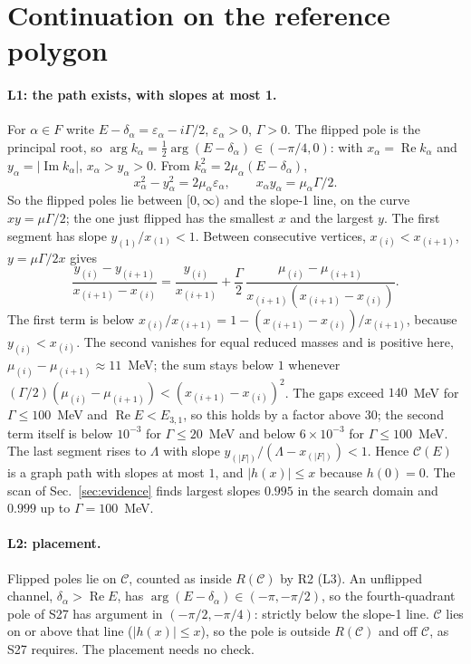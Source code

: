 \documentclass[11pt]{article}
\begin{document}
\section{Continuation on the reference polygon}

\paragraph{L1: the path exists, with slopes at most 1.} For $\alpha\in F$ write $E-\delta_\alpha=\varepsilon_\alpha-i\Gamma/2$, $\varepsilon_\alpha>0$, $\Gamma>0$. The flipped pole is the principal root, so $\arg k_\alpha=\tfrac12\arg(E-\delta_\alpha)\in(-\pi/4,0)$: with $x_\alpha=\operatorname{Re}k_\alpha$ and $y_\alpha=|\operatorname{Im}k_\alpha|$, $x_\alpha>y_\alpha>0$. From $k_\alpha^2=2\mu_\alpha(E-\delta_\alpha)$,
\[
x_\alpha^2-y_\alpha^2=2\mu_\alpha\varepsilon_\alpha,\qquad x_\alpha y_\alpha=\mu_\alpha\Gamma/2 .
\]
So the flipped poles lie between $[0,\infty)$ and the slope-1 line, on the curve $xy=\mu\Gamma/2$; the one just flipped has the smallest $x$ and the largest $y$. The first segment has slope $y_{(1)}/x_{(1)}<1$. Between consecutive vertices, $x_{(i)}<x_{(i+1)}$, $y=\mu\Gamma/2x$ gives
\[
\frac{y_{(i)}-y_{(i+1)}}{x_{(i+1)}-x_{(i)}}=\frac{y_{(i)}}{x_{(i+1)}}+\frac{\Gamma}{2}\,\frac{\mu_{(i)}-\mu_{(i+1)}}{x_{(i+1)}(x_{(i+1)}-x_{(i)})} .
\]
The first term is below $x_{(i)}/x_{(i+1)}=1-(x_{(i+1)}-x_{(i)})/x_{(i+1)}$, because $y_{(i)}<x_{(i)}$. The second vanishes for equal reduced masses and is positive here, $\mu_{(i)}-\mu_{(i+1)}\approx11$~MeV; the sum stays below $1$ whenever $(\Gamma/2)(\mu_{(i)}-\mu_{(i+1)})<(x_{(i+1)}-x_{(i)})^2$. The gaps exceed $140$~MeV for $\Gamma\le100$~MeV and $\operatorname{Re}E<E_{3,1}$, so this holds by a factor above $30$; the second term itself is below $10^{-3}$ for $\Gamma\le20$~MeV and below $6\times10^{-3}$ for $\Gamma\le100$~MeV. The last segment rises to $\Lambda$ with slope $y_{(|F|)}/(\Lambda-x_{(|F|)})<1$. Hence $\mathcal C(E)$ is a graph path with slopes at most $1$, and $|h(x)|\le x$ because $h(0)=0$. The scan of Sec.~\ref{sec:evidence} finds largest slopes $0.995$ in the search domain and $0.999$ up to $\Gamma=100$~MeV.

\paragraph{L2: placement.} Flipped poles lie on $\mathcal C$, counted as inside $R(\mathcal C)$ by R2 (L3). An unflipped channel, $\delta_\alpha>\operatorname{Re}E$, has $\arg(E-\delta_\alpha)\in(-\pi,-\pi/2)$, so the fourth-quadrant pole of S27 has argument in $(-\pi/2,-\pi/4)$: strictly below the slope-1 line. $\mathcal C$ lies on or above that line ($|h(x)|\le x$), so the pole is outside $R(\mathcal C)$ and off $\mathcal C$, as S27 requires. The placement needs no check.
\end{document}
